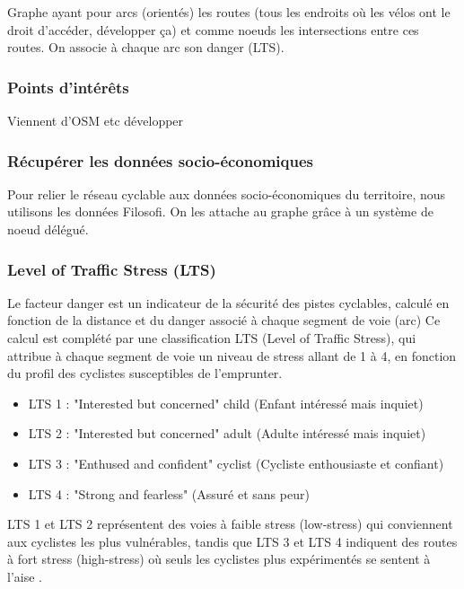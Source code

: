 \documentclass[a4paper,12pt,french]{article}
\begin{document}
Graphe ayant pour arcs (orientés) les routes (tous les endroits où les vélos ont le droit d'accéder, développer ça) et comme noeuds les intersections entre ces routes. On associe à chaque arc son danger (LTS). 

\subsubsection{Points d'intérêts}

Viennent d'OSM etc développer

\subsubsection{Récupérer les données socio-économiques}

Pour relier le réseau cyclable aux données socio-économiques du territoire, nous utilisons les données Filosofi. On les attache au graphe grâce à un système de noeud délégué.


\subsubsection{Level of Traffic Stress (LTS)}

Le facteur danger est un indicateur de la sécurité des pistes cyclables, calculé en fonction de la distance et du danger associé à chaque segment de voie (arc) Ce calcul est complété
par une classification LTS (Level of Traffic Stress), qui attribue à chaque segment de voie un
niveau de stress allant de 1 à 4, en fonction du profil des cyclistes susceptibles de l'emprunter.

\begin{itemize}
    \item LTS 1 : "Interested but concerned" child (Enfant intéressé mais inquiet)
    \item LTS 2 : "Interested but concerned" adult (Adulte intéressé mais inquiet)
    \item LTS 3 : "Enthused and confident" cyclist (Cycliste enthousiaste et confiant)
    \item LTS 4 : "Strong and fearless" (Assuré et sans peur)
\end{itemize}

LTS 1 et LTS 2 représentent des voies à faible stress (low-stress) qui conviennent aux cyclistes les plus vulnérables, tandis que LTS 3 et LTS 4 indiquent des routes à fort stress (high-stress) où seuls les cyclistes plus expérimentés se sentent à l'aise \cite{kent_karner}.
\end{document}
